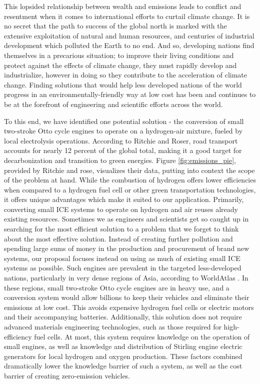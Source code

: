 \documentclass[conf]{new-aiaa}
\begin{document}
This lopsided relationship between wealth and emissions leads to conflict and resentment when it comes to international efforts to curtail climate change. It is no secret that the path to success of the global north is marked with the extensive exploitation of natural and human resources, and centuries of industrial development which polluted the Earth to no end. And so, developing nations find themselves in a precarious situation; to improve their living conditions and protect against the effects of climate change, they must rapidly develop and industrialize, however in doing so they contribute to the acceleration of climate change. Finding solutions that would help less developed nations of the world progress in an environmentally-friendly way at low cost has been and continues to be at the forefront of engineering and scientific efforts across the world.

To this end, we have identified one potential solution - the conversion of small two-stroke Otto cycle engines to operate on a hydrogen-air mixture, fueled by local electrolysis operations. According to Ritchie and Roser, road transport accounts for nearly 12 percent of the global total, making it a good target for decarbonization and transition to green energies. \cite{owidco2andgreenhousegasemissions:by_sector} Figure \ref{fig:emissions_pie}, provided by Ritchie and rose, visualizes their data, putting into context the scope of the problem at hand. While the combustion of hydrogen offers lower efficiencies when compared to a hydrogen fuel cell or other green transportation technologies, it offers unique advantages which make it suited to our application. Primarily, converting small ICE systems to operate on hydrogen and air reuses already existing resources. Sometimes we as engineers and scientists get so caught up in searching for the most efficient solution to a problem that we forget to think about the most effective solution. Instead of creating further pollution and spending large sums of money in the production and procurement of brand new systems, our proposal focuses instead on using as much of existing small ICE systems as possible. Such engines are prevalent in the targeted less-developed nations, particularly in very dense regions of Asia, according to WorldAtlas \cite{motorbike}. In these regions, small two-stroke Otto cycle engines are in heavy use, and a conversion system would allow billions to keep their vehicles and eliminate their emissions at low cost. This avoids expensive hydrogen fuel cells or electric motors and their accompanying batteries. Additionally, this solution does not require advanced materials engineering technologies, such as those required for high-efficiency fuel cells. At most, this system requires knowledge on the operation of small engines, as well as knowledge and distribution of Stirling engine electric generators for local hydrogen and oxygen production. These factors combined dramatically lower the knowledge barrier of such a system, as well as the cost barrier of creating zero-emission vehicles.
\end{document}
